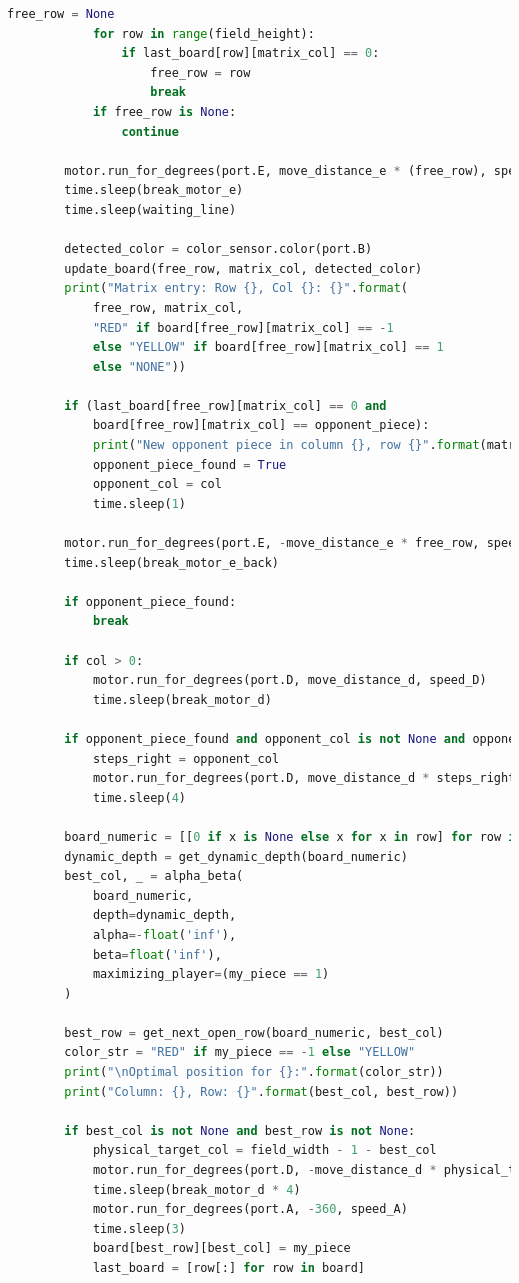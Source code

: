 \begin{lstlisting}[language=Python]
			free_row = None
			for row in range(field_height):
				if last_board[row][matrix_col] == 0:
					free_row = row
					break
			if free_row is None:
				continue
		
		motor.run_for_degrees(port.E, move_distance_e * (free_row), speed_E)
		time.sleep(break_motor_e)
		time.sleep(waiting_line)
		
		detected_color = color_sensor.color(port.B)
		update_board(free_row, matrix_col, detected_color)
		print("Matrix entry: Row {}, Col {}: {}".format(
			free_row, matrix_col,
			"RED" if board[free_row][matrix_col] == -1
			else "YELLOW" if board[free_row][matrix_col] == 1
			else "NONE"))
		
		if (last_board[free_row][matrix_col] == 0 and
			board[free_row][matrix_col] == opponent_piece):
			print("New opponent piece in column {}, row {}".format(matrix_col, free_row))
			opponent_piece_found = True
			opponent_col = col
			time.sleep(1)
		
		motor.run_for_degrees(port.E, -move_distance_e * free_row, speed_E)
		time.sleep(break_motor_e_back)
		
		if opponent_piece_found:
			break
		
		if col > 0:
			motor.run_for_degrees(port.D, move_distance_d, speed_D)
			time.sleep(break_motor_d)
		
		if opponent_piece_found and opponent_col is not None and opponent_col != 0:
			steps_right = opponent_col
			motor.run_for_degrees(port.D, move_distance_d * steps_right, speed_D)
			time.sleep(4)
		
		board_numeric = [[0 if x is None else x for x in row] for row in board]
		dynamic_depth = get_dynamic_depth(board_numeric)
		best_col, _ = alpha_beta(
			board_numeric,
			depth=dynamic_depth,
			alpha=-float('inf'),
			beta=float('inf'),
			maximizing_player=(my_piece == 1)
		)
		
		best_row = get_next_open_row(board_numeric, best_col)
		color_str = "RED" if my_piece == -1 else "YELLOW"
		print("\nOptimal position for {}:".format(color_str))
		print("Column: {}, Row: {}".format(best_col, best_row))
		
		if best_col is not None and best_row is not None:
			physical_target_col = field_width - 1 - best_col
			motor.run_for_degrees(port.D, -move_distance_d * physical_target_col, speed_D)
			time.sleep(break_motor_d * 4)
			motor.run_for_degrees(port.A, -360, speed_A)
			time.sleep(3)
			board[best_row][best_col] = my_piece
			last_board = [row[:] for row in board]
		

\end{lstlisting}
